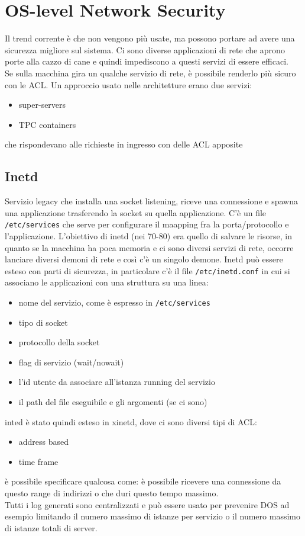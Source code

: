 \documentclass[12pt, oneside]{extbook} %
\begin{document}
\section{OS-level Network Security}
Il trend corrente è che non vengono più usate, ma possono portare ad avere una sicurezza migliore sul sistema. Ci sono diverse applicazioni di rete che aprono porte alla cazzo di cane e quindi impediscono a questi servizi di essere efficaci.\\Se sulla macchina gira un qualche servizio di rete, è possibile renderlo più sicuro con le ACL. Un approccio usato nelle architetture erano due servizi:
\begin{itemize}
\item super-servers
\item TPC containers
\end{itemize}
che rispondevano alle richieste in ingresso con delle ACL apposite
\subsection{Inetd}
Servizio legacy che installa una socket listening, riceve una connessione e spawna una applicazione trasferendo la socket su quella applicazione. C'è un file \texttt{/etc/services} che serve per configurare il maapping fra la porta/protocollo e l'applicazione. L'obiettivo di inetd (nei 70-80) era quello di salvare le risorse, in quanto se la macchina ha poca memoria e ci sono diversi servizi di rete, occorre lanciare diversi demoni di rete e così c'è un singolo demone. Inetd può essere esteso con parti di sicurezza, in particolare c'è il file \texttt{/etc/inetd.conf} in cui si associano le applicazioni con una struttura su una linea:
\begin{itemize}
	\item nome del servizio, come è espresso in \texttt{/etc/services}
	\item tipo di socket
	\item protocollo della socket
	\item flag di servizio (wait/nowait)
	\item l'id utente da associare all'istanza running del servizio
	\item il path del file eseguibile e gli argomenti (se ci sono)
\end{itemize}
inted è stato quindi esteso in xinetd, dove ci sono diversi tipi di ACL:
\begin{itemize}
\item address based
\item time frame
\end{itemize}
è possibile specificare qualcosa come: è possibile ricevere una connessione da questo range di indirizzi o che duri questo tempo massimo.\\Tutti i log generati sono centralizzati e può essere usato per prevenire DOS ad esempio limitando il numero massimo di istanze per servizio o il numero massimo di istanze totali di server.
\end{document}
